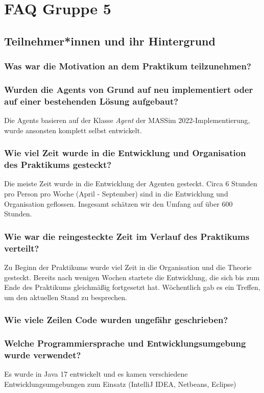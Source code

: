 \section{FAQ Gruppe 5}

\subsection{Teilnehmer*innen und ihr Hintergrund}
\subsubsection{Was war die Motivation an dem Praktikum teilzunehmen?}
\subsubsection{Wurden die Agents von Grund auf neu implementiert oder auf einer bestehenden Lösung aufgebaut?}
Die Agents basieren auf der Klasse \textit{Agent} der MASSim 2022-Implementierung, wurde ansonsten komplett selbst entwickelt.
\subsubsection{Wie viel Zeit wurde in die Entwicklung und Organisation des Praktikums gesteckt?}
Die meiste Zeit wurde in die Entwicklung der Agenten gesteckt. Circa 6 Stunden pro Person pro Woche (April - September) sind in die Entwicklung und Organisation geflossen. Insgesamt schätzen wir den Umfang auf über 600 Stunden.
\subsubsection{Wie war die reingesteckte Zeit im Verlauf des Praktikums verteilt?}
Zu Beginn der Praktikums wurde viel Zeit in die Organisation und die Theorie gesteckt. Bereits nach wenigen Wochen startete die Entwicklung, die sich bis zum Ende des Praktikums gleichmäßig fortgesetzt hat. Wöchentlich gab es ein Treffen, um den aktuellen Stand zu besprechen.
\subsubsection{Wie viele Zeilen Code wurden ungefähr geschrieben?}
\subsubsection{Welche Programmiersprache und Entwicklungsumgebung wurde verwendet?}
Es wurde in Java 17 entwickelt und es kamen verschiedene Entwicklungsumgebungen zum Einsatz (IntelliJ IDEA, Netbeans, Eclipse)
